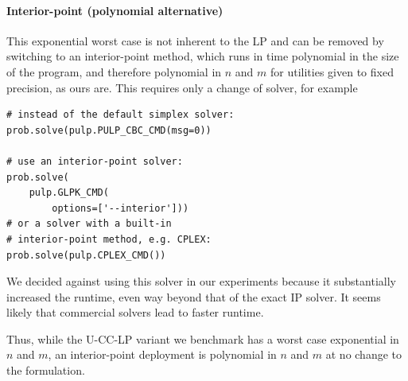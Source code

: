 \documentclass[letterpaper]{article} %
\newcommand{\LP}{\textsc{U-CC-LP}}
\begin{document}
\paragraph{Interior-point (polynomial alternative)} This exponential worst case is not inherent to the LP and can be removed by switching to an interior-point method, which runs in time polynomial in the size of the program, and therefore polynomial in \(n\) and \(m\) for utilities given to fixed precision, as ours are.
This requires only a change of solver, for example
\begin{verbatim}
# instead of the default simplex solver:
prob.solve(pulp.PULP_CBC_CMD(msg=0))

# use an interior-point solver:
prob.solve(
    pulp.GLPK_CMD(
        options=['--interior']))
# or a solver with a built-in
# interior-point method, e.g. CPLEX:
prob.solve(pulp.CPLEX_CMD())
\end{verbatim}
We decided against using this solver in our experiments because it substantially increased the runtime, even way beyond that of the exact IP solver.
It seems likely that commercial solvers lead to faster runtime.

Thus, while the \LP{} variant we benchmark has a worst case exponential in \(n\) and \(m\), an interior-point deployment is polynomial in \(n\) and \(m\) at no change to the formulation.
\end{document}
